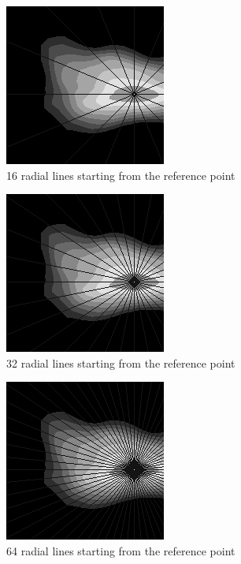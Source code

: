 \begin{figure}[htb]
  \begin{center}
    \includegraphics[width=0.4\linewidth]{ch-methodology/figures/rll16}
    \caption[16 radial lines starting from the reference point]{16 radial lines starting from the reference point}
    \label{fig:methodology:rll16}
  \end{center}
\end{figure}

\begin{figure}[htb]
  \begin{center}
    \includegraphics[width=0.4\linewidth]{ch-methodology/figures/rll32}
    \caption[32 radial lines starting from the reference point]{32 radial lines starting from the reference point}
    \label{fig:methodology:rll32}
  \end{center}
\end{figure}

\begin{figure}[htb]
  \begin{center}
    \includegraphics[width=0.4\linewidth]{ch-methodology/figures/rll64}
    \caption[64 radial lines starting from the reference point]{64 radial lines starting from the reference point}
    \label{fig:methodology:rll64}
  \end{center}
\end{figure}

